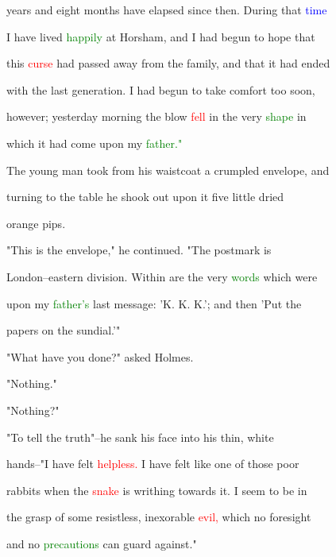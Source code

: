 years and eight months have elapsed since then. During that \textcolor{blue}{time}

 I have lived \textcolor{green}{happily} at Horsham, and I had begun to \textcolor{BurntOrange}{hope} that

 this \textcolor{red}{curse} had passed away from the family, and that it had ended

 with the last generation. I had begun to take \textcolor{BurntOrange}{comfort} too soon,

 however; yesterday morning the blow \textcolor{red}{fell} in the very \textcolor{green}{shape} in

 which it had come upon my \textcolor{green}{father."}



 The \textcolor{BurntOrange}{young} man took from his waistcoat a crumpled envelope, and

 turning to the table he shook out upon it five little dried

 orange pips.



 "This is the envelope," he continued. "The postmark is

 London--eastern division. Within are the very \textcolor{green}{words} which were

 upon my \textcolor{green}{father's} last message: 'K. K. K.'; and then 'Put the

 papers on the \textcolor{BurntOrange}{sundial.'"}



 "What have you done?" asked Holmes.



 "Nothing."



 "Nothing?"



 "To tell the truth"--he sank his face into his thin, \textcolor{BurntOrange}{white}

 hands--"I have felt \textcolor{red}{helpless.} I have felt like one of those poor

 rabbits when the \textcolor{red}{snake} is writhing towards it. I seem to be in

 the grasp of some resistless, inexorable \textcolor{red}{evil,} which no \textcolor{BurntOrange}{foresight}

 and no \textcolor{green}{precautions} can \textcolor{BurntOrange}{guard} against."



